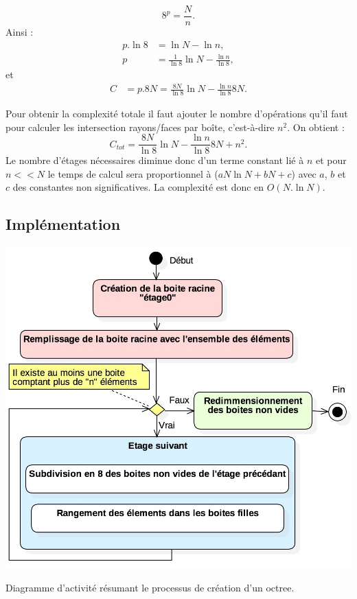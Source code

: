 \begin{equation} 
8^p = \frac{N}{n}.
\end{equation}
%
Ainsi :
\begin{align}
p.\ln{8} &= \ln{N} -  \ln{n}, \nonumber \\
p &= \frac{1}{\ln{8}}\ln{N} -  \frac{\ln{n}}{\ln{8}}, 
\end{align}
et
\begin{align}
C &=  p.8N = \frac{8N}{\ln8}\ln{N} - \frac{\ln n }{\ln8}8N.
\end{align}

Pour obtenir la complexité totale il faut ajouter le nombre d'opérations qu'il faut pour calculer les intersection rayons/faces par boîte, c'est-à-dire $n^2$. On obtient :
\begin{equation}
C_{tot} = \frac{8N}{\ln8}\ln{N} - \frac{\ln n }{\ln8}8N + n^2.
\end{equation}
Le nombre d'étages nécessaires diminue donc d'un terme constant lié à $n$ et pour $n << N$ le temps de calcul sera proportionnel à ($aN\ln{N} + bN + c$) avec $a$, $b$ et $c$ des constantes non significatives. La complexité est donc en $O(N.\ln{N})$.



\subsection{Implémentation}


\begin{figureth}
	\includegraphics[width=0.7\linewidth]{images/DiagOctree}
	\caption{Diagramme d'activité résumant le processus de création d'un \gls{octree}.}
	\label{DiagOctree}
\end{figureth}

